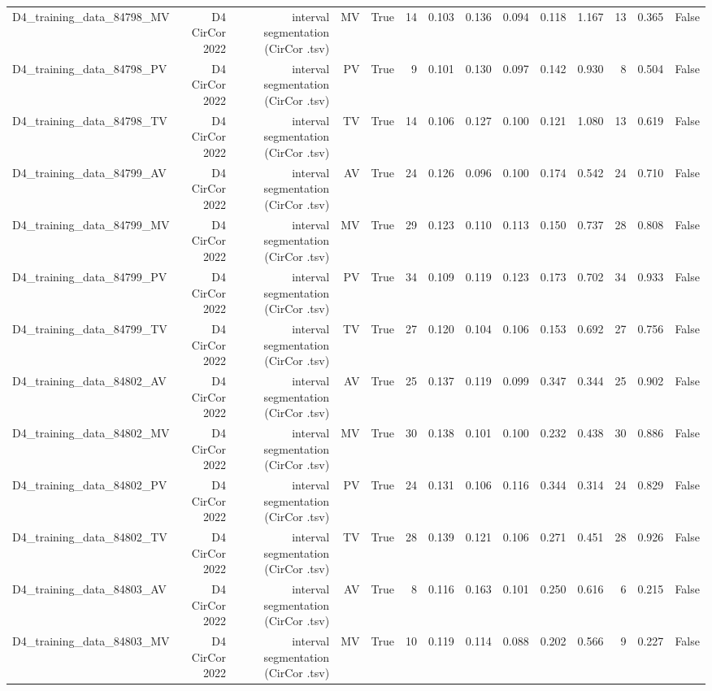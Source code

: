\begin{table}[htbp]
\begin{tabular}{lrrrrrrrrrrrrr}
    D4\_training\_data\_84798\_MV & D4 CirCor 2022 & interval segmentation (CirCor .tsv) & MV & True & 14 & 0.103 & 0.136 & 0.094 & 0.118 & 1.167 & 13 & 0.365 & False \\
    D4\_training\_data\_84798\_PV & D4 CirCor 2022 & interval segmentation (CirCor .tsv) & PV & True & 9 & 0.101 & 0.130 & 0.097 & 0.142 & 0.930 & 8 & 0.504 & False \\
    D4\_training\_data\_84798\_TV & D4 CirCor 2022 & interval segmentation (CirCor .tsv) & TV & True & 14 & 0.106 & 0.127 & 0.100 & 0.121 & 1.080 & 13 & 0.619 & False \\
    D4\_training\_data\_84799\_AV & D4 CirCor 2022 & interval segmentation (CirCor .tsv) & AV & True & 24 & 0.126 & 0.096 & 0.100 & 0.174 & 0.542 & 24 & 0.710 & False \\
    D4\_training\_data\_84799\_MV & D4 CirCor 2022 & interval segmentation (CirCor .tsv) & MV & True & 29 & 0.123 & 0.110 & 0.113 & 0.150 & 0.737 & 28 & 0.808 & False \\
    D4\_training\_data\_84799\_PV & D4 CirCor 2022 & interval segmentation (CirCor .tsv) & PV & True & 34 & 0.109 & 0.119 & 0.123 & 0.173 & 0.702 & 34 & 0.933 & False \\
    D4\_training\_data\_84799\_TV & D4 CirCor 2022 & interval segmentation (CirCor .tsv) & TV & True & 27 & 0.120 & 0.104 & 0.106 & 0.153 & 0.692 & 27 & 0.756 & False \\
    D4\_training\_data\_84802\_AV & D4 CirCor 2022 & interval segmentation (CirCor .tsv) & AV & True & 25 & 0.137 & 0.119 & 0.099 & 0.347 & 0.344 & 25 & 0.902 & False \\
    D4\_training\_data\_84802\_MV & D4 CirCor 2022 & interval segmentation (CirCor .tsv) & MV & True & 30 & 0.138 & 0.101 & 0.100 & 0.232 & 0.438 & 30 & 0.886 & False \\
    D4\_training\_data\_84802\_PV & D4 CirCor 2022 & interval segmentation (CirCor .tsv) & PV & True & 24 & 0.131 & 0.106 & 0.116 & 0.344 & 0.314 & 24 & 0.829 & False \\
    D4\_training\_data\_84802\_TV & D4 CirCor 2022 & interval segmentation (CirCor .tsv) & TV & True & 28 & 0.139 & 0.121 & 0.106 & 0.271 & 0.451 & 28 & 0.926 & False \\
    D4\_training\_data\_84803\_AV & D4 CirCor 2022 & interval segmentation (CirCor .tsv) & AV & True & 8 & 0.116 & 0.163 & 0.101 & 0.250 & 0.616 & 6 & 0.215 & False \\
    D4\_training\_data\_84803\_MV & D4 CirCor 2022 & interval segmentation (CirCor .tsv) & MV & True & 10 & 0.119 & 0.114 & 0.088 & 0.202 & 0.566 & 9 & 0.227 & False \\

\end{tabular}
\end{table}
